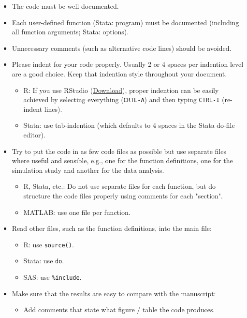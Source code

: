 \documentclass[12pt,a4paper]{article}
\begin{document}
\begin{itemize}
\item The code {must} be well documented.
\item Each user-defined function (\textsf{Stata}: program) {must} be documented
  (including all function arguments; \textsf{Stata}: options).
\item Unnecessary comments (such as alternative code lines) {should} be
  avoided.
\item Please indent for your code properly. Usually 2 or 4 spaces per indention
  level are a good choice. Keep that indention style throughout your document.
  \begin{itemize}
  \item \textsf{R}: If you use RStudio
    (\href{http://www.rstudio.com/products/rstudio/download/}{Download}), proper
    indention can be easily achieved by selecting everything (\texttt{CRTL-A})
    and then typing \texttt{CTRL-I} (re-indent lines). 
  \item \textsf{Stata}: use tab-indention (which defaults to 4 spaces in the
    Stata do-file editor).
  \end{itemize}
\item Try to put the code in as few code files as possible but use separate
  files where useful and sensible, e.g., one for the function definitions, one
  for the simulation study and another for the data analysis.
  \begin{itemize}
  \item \textsf{R}, \textsf{Stata}, etc.: Do not use separate files for each function,
    but do structure the code files properly using comments for each "section".
  \item \textsf{MATLAB}: use one file per function.
  \end{itemize}
\item Read other files, such as the function definitions, into the main file:
  \begin{itemize}
  \item \textsf{R}: use \texttt{source()}.
  \item \textsf{Stata}: use \texttt{do}.
  \item \textsf{SAS}: use \texttt{\%include}.
  \end{itemize}
\item Make sure that the results are easy to compare with the manuscript:
  \begin{itemize}
  \item Add comments that state what figure / table the code produces.

\end{itemize}
\end{itemize}
\end{document}
